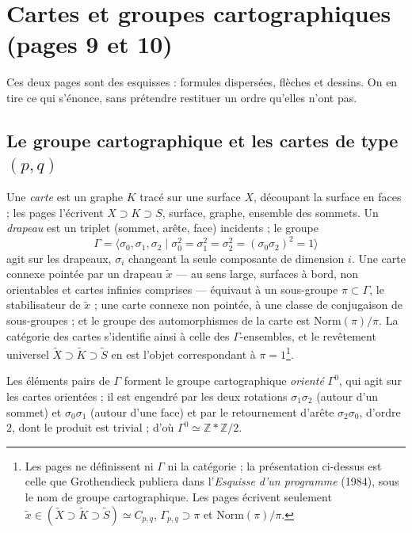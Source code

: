 \documentclass[11pt,a4paper]{article}
\begin{document}
\section*{Cartes et groupes cartographiques (pages 9 et 10)}

Ces deux pages sont des esquisses : formules dispersées, flèches et dessins.
On en tire ce qui s'énonce, sans prétendre restituer un ordre qu'elles n'ont
pas.

\subsection*{Le groupe cartographique et les cartes de type $(p, q)$}

Une \emph{carte} est un graphe $K$ tracé sur une surface $X$, découpant la
surface en faces ; les pages l'écrivent $X \supset K \supset S$, surface,
graphe, ensemble des sommets. Un \emph{drapeau} est un triplet
(sommet, arête, face) incidents ; le groupe
\[
\Gamma = \langle \sigma_0, \sigma_1, \sigma_2 \mid \sigma_0^2 = \sigma_1^2 = \sigma_2^2 = (\sigma_0\sigma_2)^2 = 1 \rangle
\]
agit sur les drapeaux, $\sigma_i$ changeant la seule composante de dimension $i$.
Une carte connexe pointée par un drapeau $\tilde{x}$ — au sens large, surfaces à
bord, non orientables et cartes infinies comprises — équivaut à un sous-groupe
$\pi \subset \Gamma$, le stabilisateur de $\tilde{x}$ ; une carte connexe
non pointée, à une classe de conjugaison de sous-groupes ; et le groupe des
automorphismes de la carte est $\mathrm{Norm}(\pi)/\pi$. La catégorie des cartes
s'identifie ainsi à celle des $\Gamma$-ensembles, et le revêtement universel
$\widetilde{X} \supset \widetilde{K} \supset \widetilde{S}$ en est l'objet
correspondant à $\pi = 1$\footnote{Les pages ne définissent ni $\Gamma$ ni la
catégorie ; la présentation ci-dessus est celle que Grothendieck publiera dans
l'\emph{Esquisse d'un programme} (1984), sous le nom de groupe cartographique.
Les pages écrivent seulement
$\tilde{x} \in (\widetilde{X} \supset \widetilde{K} \supset \widetilde{S}) \simeq C_{p,q}$,
$\Gamma_{p,q} \supset \pi$ et $\mathrm{Norm}(\pi)/\pi$.}.

Les éléments pairs de $\Gamma$ forment le groupe cartographique \emph{orienté}
$\Gamma^{0}$, qui agit sur les cartes orientées ; il est engendré par les deux
rotations $\sigma_1\sigma_2$ (autour d'un sommet) et $\sigma_0\sigma_1$ (autour d'une
face) et par le retournement d'arête $\sigma_2\sigma_0$, d'ordre $2$, dont le produit
est trivial ; d'où $\Gamma^{0} \simeq \mathbb{Z} * \mathbb{Z}/2$.
\end{document}
